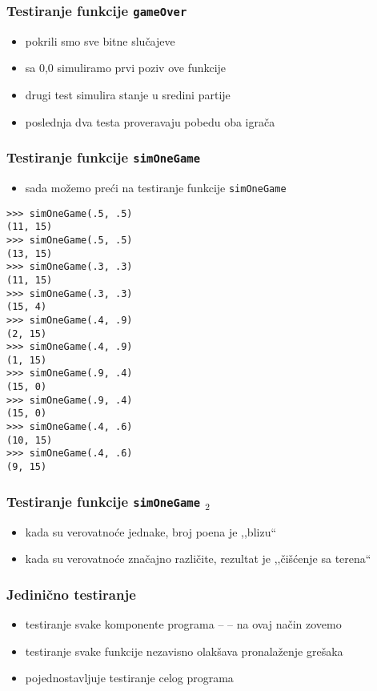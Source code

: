 \documentclass[utf8,compress,aspectratio=169]{beamer}
\begin{document}
\begin{frame}
  \frametitle{Testiranje funkcije \texttt{gameOver}}
\begin{itemize}
  \item pokrili smo sve bitne slučajeve
  \item sa 0,0 simuliramo prvi poziv ove funkcije
  \item drugi test simulira stanje u sredini partije
  \item poslednja dva testa proveravaju pobedu oba igrača
\end{itemize}
\end{frame}

\begin{frame}[fragile,shrink=10]
  \frametitle{Testiranje funkcije \texttt{simOneGame}}
\begin{itemize}
  \item sada možemo preći na testiranje funkcije \texttt{simOneGame}
\end{itemize}
\begin{verbatim}
>>> simOneGame(.5, .5)
(11, 15)
>>> simOneGame(.5, .5)
(13, 15)
>>> simOneGame(.3, .3)
(11, 15)
>>> simOneGame(.3, .3)
(15, 4)
>>> simOneGame(.4, .9)
(2, 15)
>>> simOneGame(.4, .9)
(1, 15)
>>> simOneGame(.9, .4)
(15, 0)
>>> simOneGame(.9, .4)
(15, 0)
>>> simOneGame(.4, .6)
(10, 15)
>>> simOneGame(.4, .6)
(9, 15)
\end{verbatim}
\end{frame}

\begin{frame}
  \frametitle{Testiranje funkcije \texttt{simOneGame} $_2$}
\begin{itemize}
  \item kada su verovatnoće jednake, broj poena je ,,blizu``
  \item kada su verovatnoće značajno različite, rezultat je ,,čišćenje sa terena``
\end{itemize}
\end{frame}

\begin{frame}
  \frametitle{Jedinično testiranje}
\begin{itemize}
  \item testiranje svake komponente programa --  -- na ovaj način zovemo 
  \item testiranje svake funkcije nezavisno olakšava pronalaženje grešaka
  \item pojednostavljuje testiranje celog programa
\end{itemize}
\end{frame}
\end{document}
